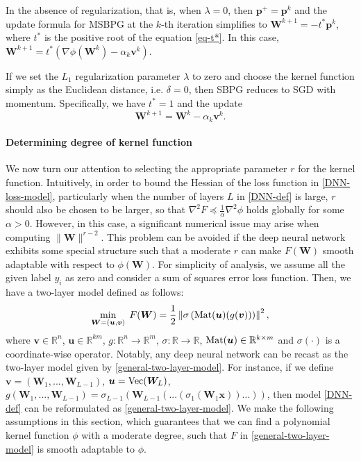\documentclass[twoside,11pt]{article}
\newcommand{\be}{\begin{equation}}
\newcommand{\ee}{\end{equation}}
\newcommand{\R}{\mathbb R}
\def\Mat{{\rm Mat}}
\def\vp{{\bm{p}}}
\def\vu{{\bm{u}}}
\def\vv{{\bm{v}}}
\def\vx{{\bm{x}}}
\def\mW{{\bm{W}}}
\begin{document}
\begin{example}
In the absence of regularization, that is, when $\lambda=0$, 
then $\bm{p}^+ = \bm{p}^k$ and 
the update formula for MSBPG  at the $k$-th iteration simplifies to ${\mW}^{k+1}=-t^* \vp^k$, where $t^*$ is the positive root of the equation
\eqref{eq-t*}. In this case,
$\mW^{k+1} = t^*(\nabla\phi(\mW^k)-\alpha_k\vv^k)$.
\end{example}
\begin{example}
If we set the $L_1$ regularization parameter $\lambda$ to zero and choose the kernel function simply as the Euclidean distance, i.e. $\delta=0$, then SBPG  reduces to SGD with momentum. Specifically, we have $t^*=1$ and the update
\[
{\mW}^{k+1}={\mW}^k-\alpha_k\vv^k.
\]
\end{example} 

\paragraph{Determining degree of kernel function}
We now turn our attention to selecting the appropriate parameter $r$ for the kernel function. Intuitively, in order to bound the Hessian of the loss function in \eqref{DNN-loss-model}, particularly when the number of layers $L$ in \eqref{DNN-def} is large, $r$ should also be chosen to be larger, so that $\nabla^2F\preceq\frac{1}{\alpha}\nabla^2\phi$ holds globally for some $\alpha>0$. However, in this case, a significant numerical issue may arise when computing $\|{\mW}\|^{r-2}$. This problem can be avoided if the deep neural network exhibits some special structure such that a moderate $r$ can make $F(\mW)$ smooth adaptable with respect to $\phi(\mW)$. For simplicity of analysis, we assume all the given label $y_i$ as zero and consider a sum of squares error loss function. Then, we have a two-layer model defined as follows:
\be 
\min_{\mW=(\vu,\vv)}\;F(\mW)=\frac{1}{2}\left\|\sigma\left(\Mat(\vu)(g(\vv))\right)\right\|^2,
\label{general-two-layer-model}
\ee 
where $\vv\in\R^n$, $\vu\in\R^{km}$, $g:\R^n\rightarrow\R^m$, $\sigma:\R\rightarrow\R$, $\Mat(\vu)\in\R^{k\times m}$ and $\sigma(\cdot)$ is a coordinate-wise operator. Notably, any deep neural network can be recast as the two-layer model given by \eqref{general-two-layer-model}. For instance, if we define $\vv=(\mW_1,...,\mW_{L-1})$, $\vu={\rm Vec}(\mW_L)$, $g(\mW_1,...,\mW_{L-1})=\sigma_{L-1}(\mW_{L-1}(...(\sigma_1( \mW_1\vx))...))$, then model \eqref{DNN-def} can be reformulated as \eqref{general-two-layer-model}. We make the following assumptions in this section, which guarantees that we can find a polynomial kernel function $\phi$ with a moderate degree, such that $F$ in \eqref{general-two-layer-model} is smooth adaptable to $\phi$.
\end{document}
